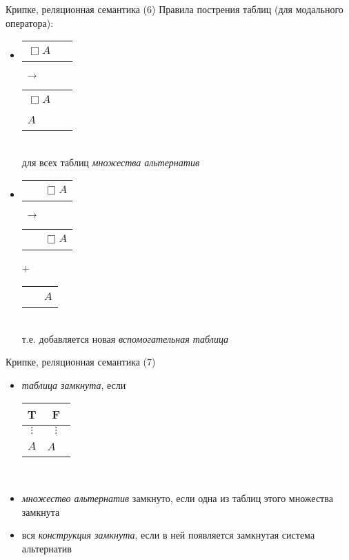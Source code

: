 \documentclass{beamer}
\begin{document}
\begin{frame}{Крипке, реляционная семантика (6)}
Правила пострения таблиц (для модального оператора):\\
\bigskip
\begin{itemize}
  \item 
      \begin{tabular}{p{0.75cm}|p{0.75cm}}
        \hline
        $\Box A$ & ~ \\
      \end{tabular}
      $\; \to \;$
      \begin{tabular}{p{0.75cm}|p{0.75cm}}
        \hline
        $\Box A$ & ~ \\
        $A$ & ~ \\
      \end{tabular}\\
      \bigskip
      {\scriptsize для всех таблиц \textit{множества альтернатив}}\\
      \bigskip
  \item 
      \begin{tabular}{p{0.75cm}|p{0.75cm}}
        \hline
        ~ & $\Box A$ \\
      \end{tabular}
      $\; \to \;$
      \begin{tabular}{p{0.75cm}|p{0.75cm}}
        \hline
        ~ & $\Box A$ \\
      \end{tabular} +
      \begin{tabular}{p{0.75cm}|p{0.75cm}}
        \hline
        ~ & $A$ \\
      \end{tabular}\\
      \bigskip
      {\scriptsize т.е. добавляется новая \textit{вспомогательная таблица}}\\
\end{itemize}
\end{frame}

\begin{frame}{Крипке, реляционная семантика (7)}
\begin{itemize}
  \item \textit{таблица замкнута}, если
      \begin{tabular}{c|c}
        T & F \\ \hline
        $\vdots$ & $\vdots$ \\
        $A$ & $A$ ~ \\
      \end{tabular}\\
      \bigskip
  \item \textit{множество альтернатив} замкнуто, если одна из таблиц этого множества замкнута
  \item вся \textit{конструкция замкнута}, если в ней появляется замкнутая система альтернатив
\end{itemize}
\end{frame}
\end{document}

